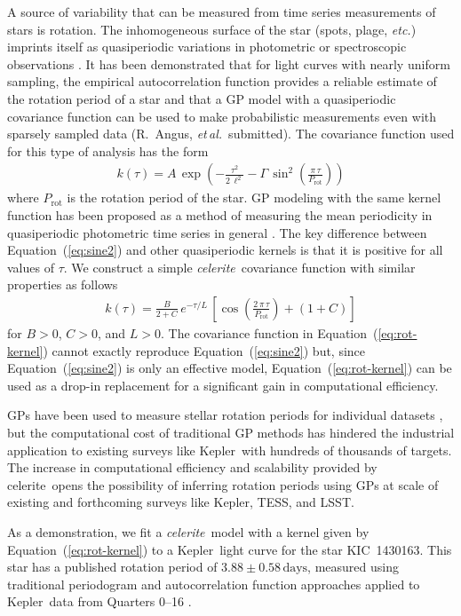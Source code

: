 \documentclass[manuscript, letterpaper]{aastex6}
\newcommand{\project}[1]{\textsf{#1}}
\newcommand{\kepler}{\project{Kepler}}
\newcommand{\lsst}{\project{LSST}}
\newcommand{\tess}{\project{TESS}}
\newcommand{\celerite}{\project{celerite}}
\newcommand{\celeriteterm}{\emph{celerite}}
\newcommand{\foreign}[1]{\emph{#1}}
\newcommand{\etal}{\foreign{et\,al.}}
\newcommand{\etc}{\foreign{etc.}}
\renewcommand{\eqref}[1]{\ref{eq:#1}}
\newcommand{\Eq}[1]{Equation~(\eqref{#1})}
\newcommand{\eq}[1]{\Eq{#1}}
\newcommand{\eqlabel}[1]{\label{eq:#1}}
\newcommand{\response}[1]{{\color{blue}#1}}
\begin{document}
A source of variability that can be measured from time series measurements of
stars is rotation.
The inhomogeneous surface of the star (spots, plage, \etc) imprints itself as
quasiperiodic variations in photometric or spectroscopic observations
\citep{Dumusque:2014}.
It has been demonstrated that for light curves with nearly uniform sampling,
the empirical autocorrelation function provides a reliable estimate of the
rotation period of a star \citep{Mcquillan:2013, Mcquillan:2014, Aigrain:2015}
and that a GP model with a
quasiperiodic covariance function can be used to make probabilistic
measurements even with sparsely sampled data (R.~Angus, \etal\ submitted).
The covariance function used for this type of analysis has the form
\begin{eqnarray}\eqlabel{sine2}
k(\tau) = A\,\exp\left(-\frac{\tau^2}{2\,\ell^2} -
    \Gamma\,\sin^2\left(\frac{\pi\,\tau}{P_\mathrm{rot}} \right) \right)
\end{eqnarray}
where $P_\mathrm{rot}$ is the rotation period of the star.
GP modeling with the same kernel function has been proposed as a method of
measuring the mean periodicity in quasiperiodic photometric time series in
general \citep{Wang:2012}.
The key difference between \eq{sine2} and other quasiperiodic kernels is that
it is positive for all values of $\tau$.
We construct a simple \celeriteterm\ covariance function with similar
properties as follows
\begin{eqnarray}\eqlabel{rot-kernel}
k(\tau) = \frac{B}{2+C}\,e^{-\tau/L}\,\left[
    \cos\left(\frac{2\,\pi\,\tau}{P_\mathrm{rot}}\right) + (1 + C)
\right]
\end{eqnarray}
for $B>0$, $C>0$, and $L>0$.
The covariance function in \eq{rot-kernel} cannot exactly reproduce \eq{sine2}
but, since \eq{sine2} is only an effective model, \eq{rot-kernel} can be used
as a drop-in replacement for a significant gain in computational efficiency.

\response{GPs have been used to measure stellar rotation periods for
individual datasets \citep[for example][]{Littlefair:2017}, but the
computational cost of traditional GP methods has hindered the industrial
application to existing surveys like \kepler\ with hundreds of thousands of
targets.
The increase in computational efficiency and scalability provided by
\celerite\ opens the possibility of inferring rotation periods using GPs at
scale of existing and forthcoming surveys like \kepler, \tess, and \lsst.
}

As a demonstration, we fit a \celeriteterm\ model with a kernel given
by \eq{rot-kernel} to a \kepler\ light curve for the star KIC~1430163.
This star has a published rotation period of $3.88 \pm 0.58\,\mathrm{days}$,
measured using traditional periodogram and autocorrelation function approaches
applied to \kepler\ data from Quarters 0--16 \citep{Mathur:2014}.
\end{document}
